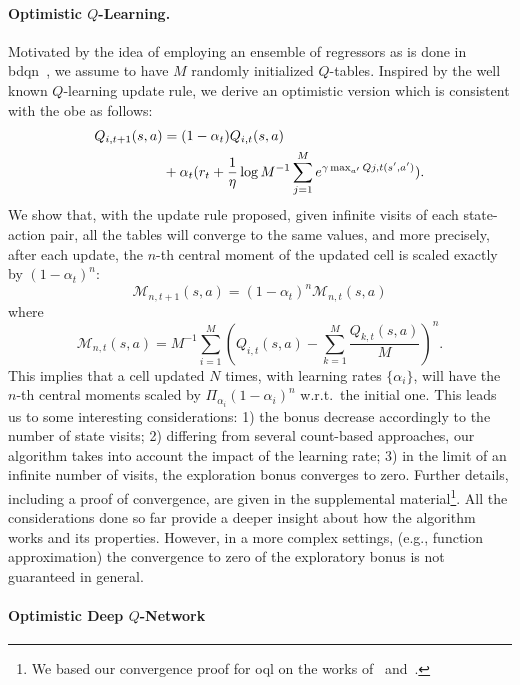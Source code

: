 \paragraph{Optimistic $Q$-Learning.}
Motivated by the idea of employing an ensemble of regressors as is done in \gls{bdqn}~\cite{osband2017deep}, we assume to have $M$ randomly initialized $Q$-tables. Inspired by the well known $Q$-learning update rule, we derive an optimistic version which is consistent with the \gls{obe} as follows:
\begin{align*}
      \small  Q_{i, t+1}(s,a) &= (1-\alpha_t)Q_{i,t}(s,a)  \nonumber  \\
  & \small + \alpha_t (r_t + \frac{1}{\eta} \log M^{-1} \sum_{j=1}^M e^{\gamma \max_{a'} Q{j,t}(s', a')}).\nonumber
\end{align*}
\label{def:optimistic_qlearning}
We show that, with the update rule proposed, given infinite visits of each state-action pair, all the tables will converge to the same values, and more precisely, after each update, the $n$-th central moment of the updated cell is scaled exactly by $(1 - \alpha_t)^n$:
\begin{equation}
	\mathcal{M}_{n,t+1}(s,a) = (1-\alpha_t)^n \mathcal{M}_{n,t}(s,a) \label{momentdecreasing}
\end{equation}
where 
\begin{equation}
	\mathcal{M}_{n,t}(s,a) = M^{-1} \sum_{i=1}^M (Q_{i,t}(s,a) - \sum_{k=1}^M \frac{Q_{k,t}(s,a)}{M})^n. \nonumber
\end{equation}
This implies that a cell updated $N$ times, with learning rates $\{\alpha_i\}$, will have the $n$-th central moments scaled by $\Pi_{\alpha_i}(1-\alpha_i)^n$ w.r.t.\ the initial one. This leads us to some interesting considerations: 1) the bonus decrease accordingly to the number of state visits; 2) differing from several count-based approaches, our algorithm takes into account the impact of the learning rate; 3) in the limit of an infinite number of visits, the exploration bonus converges to zero.
Further details, including a proof of convergence, are given in the supplemental material\footnote{We based our convergence proof for \gls{oql} on the works of~\cite{melo2001convergence} and~\cite{jaakkola1994convergence}.}.
All the considerations done so far provide a deeper insight about how the algorithm works and its properties. However, in a more complex settings, (e.g., function approximation) the convergence to zero of the exploratory bonus is not guaranteed in general.

\paragraph{Optimistic Deep $Q$-Network}
\label{sec:proposedalg}


